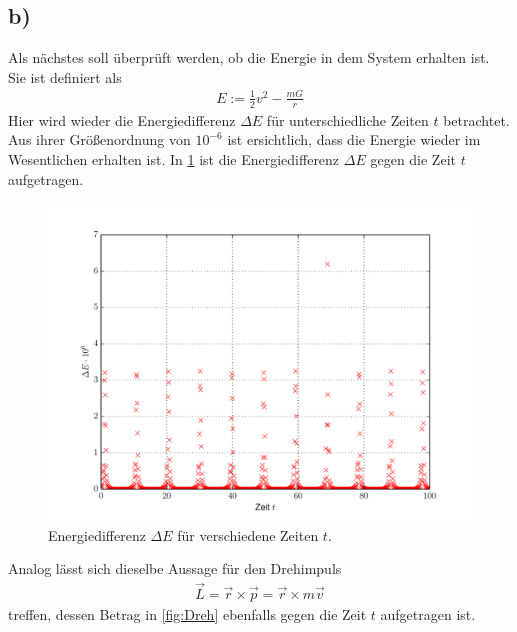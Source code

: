 \subsection*{b)}
Als nächstes soll überprüft werden, ob die Energie in dem System erhalten ist.
Sie ist definiert als
\begin{align}
	E:=\frac{1}{2}v^2-\frac{mG}{r}
\end{align}
Hier wird wieder die Energiedifferenz $\Delta E$ für unterschiedliche Zeiten $t$ betrachtet.
Aus ihrer Größenordnung von $10^{-6}$ ist ersichtlich, dass die Energie wieder im Wesentlichen erhalten ist.
In \cref{fig:Energie} ist die Energiedifferenz $\Delta E$ gegen die Zeit $t$ aufgetragen.
\begin{figure}[H]
	\centering
	\includegraphics[width = \textwidth]{../Plots/Plot_4_Energie.pdf}
	\caption{Energiedifferenz $\Delta E$ für verschiedene Zeiten $t$.\label{fig:Energie}}
\end{figure}
Analog lässt sich dieselbe Aussage für den Drehimpuls
\begin{align}
\vec{L}=\vec{r}\times\vec{p}=\vec{r}\times m\vec{v}
\end{align}
treffen, dessen Betrag in \cref{fig:Dreh} ebenfalls gegen die Zeit $t$ aufgetragen ist.
